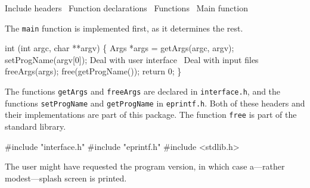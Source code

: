\nwenddocs{}\endmoddef\nwstartdeflinemarkup\nwenddeflinemarkup
\LA{}Include headers~{\nwtagstyle{}}\RA{}
\LA{}Function declarations~{\nwtagstyle{}}\RA{}
\LA{}Functions~{\nwtagstyle{}}\RA{}
\LA{}Main function~{\nwtagstyle{}}\RA{}

\nwendcode{}\nwdocspar
The \texttt{main} function is implemented first, as it
determines the rest.

\nwenddocs{}\endmoddef\nwstartdeflinemarkup{}\nwenddeflinemarkup
int (int argc, char **argv) \{
  Args *args = getArgs(argc, argv);
  setProgName(argv[0]);
  \LA{}Deal with user interface~{\nwtagstyle{}}\RA{}
  \LA{}Deal with input files~{\nwtagstyle{}}\RA{}
  freeArgs(args);
  free(getProgName());
  return 0;
\}

\nwendcode{}\nwdocspar
The functions \texttt{getArgs} and \texttt{freeArgs} are declared in
\texttt{interface.h}, and the functions \texttt{setProgName} and
\texttt{getProgName} in \texttt{eprintf.h}. Both of these headers and
their implementations are part of this package. The function
\texttt{free} is part of the standard library.

\nwenddocs{}\endmoddef\nwstartdeflinemarkup{}\nwenddeflinemarkup
#include "interface.h"
#include "eprintf.h"
#include <stdlib.h>

\nwendcode{}\nwdocspar
The user might have requested the
program version, in which case a---rather modest---splash screen is
printed.

